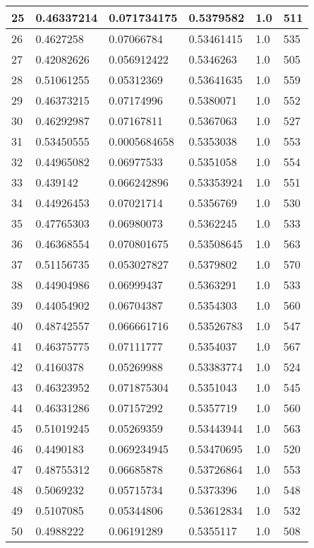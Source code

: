 \begin{longtable}{|l|l|l|l|l|l|}
25 & 0.46337214 & 0.071734175 & 0.5379582 & 1.0 & 511 \\ \hline 
26 & 0.4627258 & 0.07066784 & 0.53461415 & 1.0 & 535 \\ \hline 
27 & 0.42082626 & 0.056912422 & 0.5346263 & 1.0 & 505 \\ \hline 
28 & 0.51061255 & 0.05312369 & 0.53641635 & 1.0 & 559 \\ \hline 
29 & 0.46373215 & 0.07174996 & 0.5380071 & 1.0 & 552 \\ \hline 
30 & 0.46292987 & 0.07167811 & 0.5367063 & 1.0 & 527 \\ \hline 
31 & 0.53450555 & 0.0005684658 & 0.5353038 & 1.0 & 553 \\ \hline 
32 & 0.44965082 & 0.06977533 & 0.5351058 & 1.0 & 554 \\ \hline 
33 & 0.439142 & 0.066242896 & 0.53353924 & 1.0 & 551 \\ \hline 
34 & 0.44926453 & 0.07021714 & 0.5356769 & 1.0 & 530 \\ \hline 
35 & 0.47765303 & 0.06980073 & 0.5362245 & 1.0 & 533 \\ \hline 
36 & 0.46368554 & 0.070801675 & 0.53508645 & 1.0 & 563 \\ \hline 
37 & 0.51156735 & 0.053027827 & 0.5379802 & 1.0 & 570 \\ \hline 
38 & 0.44904986 & 0.06999437 & 0.5363291 & 1.0 & 533 \\ \hline 
39 & 0.44054902 & 0.06704387 & 0.5354303 & 1.0 & 560 \\ \hline 
40 & 0.48742557 & 0.066661716 & 0.53526783 & 1.0 & 547 \\ \hline 
41 & 0.46375775 & 0.07111777 & 0.5354037 & 1.0 & 567 \\ \hline 
42 & 0.4160378 & 0.05269988 & 0.53383774 & 1.0 & 524 \\ \hline 
43 & 0.46323952 & 0.071875304 & 0.5351043 & 1.0 & 545 \\ \hline 
44 & 0.46331286 & 0.07157292 & 0.5357719 & 1.0 & 560 \\ \hline 
45 & 0.51019245 & 0.05269359 & 0.53443944 & 1.0 & 563 \\ \hline 
46 & 0.4490183 & 0.069234945 & 0.53470695 & 1.0 & 520 \\ \hline 
47 & 0.48755312 & 0.06685878 & 0.53726864 & 1.0 & 553 \\ \hline 
48 & 0.5069232 & 0.05715734 & 0.5373396 & 1.0 & 548 \\ \hline 
49 & 0.5107085 & 0.05344806 & 0.53612834 & 1.0 & 532 \\ \hline 
50 & 0.4988222 & 0.06191289 & 0.5355117 & 1.0 & 508 \\ \hline 
\end{longtable}